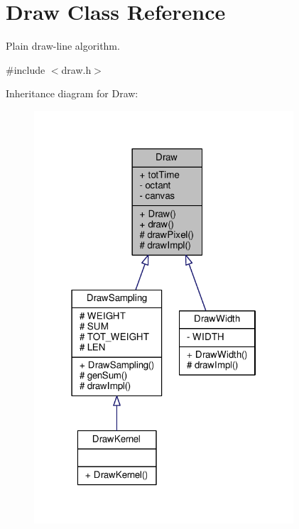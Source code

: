 \hypertarget{classDraw}{}\section{Draw Class Reference}
\label{classDraw}


Plain draw-\/line algorithm.  




{\ttfamily \#include $<$draw.\+h$>$}



Inheritance diagram for Draw\+:
\nopagebreak
\begin{figure}[H]
\begin{center}
\leavevmode
\includegraphics[width=274pt]{classDraw__inherit__graph}
\end{center}
\end{figure}



